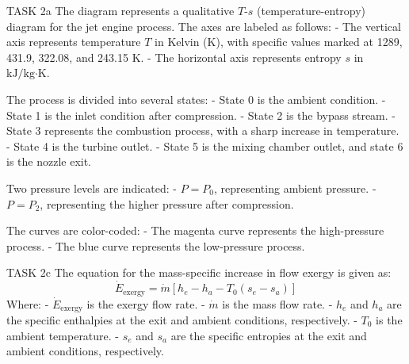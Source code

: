 TASK 2a  
The diagram represents a qualitative \( T \)-\( s \) (temperature-entropy) diagram for the jet engine process. The axes are labeled as follows:  
- The vertical axis represents temperature \( T \) in Kelvin (K), with specific values marked at 1289, 431.9, 322.08, and 243.15 K.  
- The horizontal axis represents entropy \( s \) in \( \text{kJ/kg·K} \).  

The process is divided into several states:  
- State 0 is the ambient condition.  
- State 1 is the inlet condition after compression.  
- State 2 is the bypass stream.  
- State 3 represents the combustion process, with a sharp increase in temperature.  
- State 4 is the turbine outlet.  
- State 5 is the mixing chamber outlet, and state 6 is the nozzle exit.  

Two pressure levels are indicated:  
- \( P = P_0 \), representing ambient pressure.  
- \( P = P_2 \), representing the higher pressure after compression.  

The curves are color-coded:  
- The magenta curve represents the high-pressure process.  
- The blue curve represents the low-pressure process.  

TASK 2c  
The equation for the mass-specific increase in flow exergy is given as:  
\[
\dot{E}_{\text{exergy}} = \dot{m} \left[ h_e - h_a - T_0 (s_e - s_a) \right]
\]  
Where:  
- \( \dot{E}_{\text{exergy}} \) is the exergy flow rate.  
- \( \dot{m} \) is the mass flow rate.  
- \( h_e \) and \( h_a \) are the specific enthalpies at the exit and ambient conditions, respectively.  
- \( T_0 \) is the ambient temperature.  
- \( s_e \) and \( s_a \) are the specific entropies at the exit and ambient conditions, respectively.